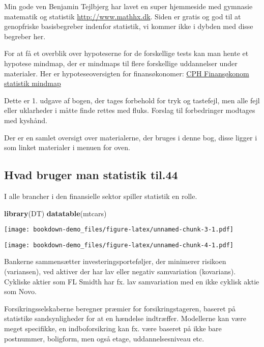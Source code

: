 \documentclass[]{book}
\newenvironment{Shaded}{\begin{snugshade}}{\end{snugshade}}
\newcommand{\KeywordTok}[1]{\textcolor[rgb]{0.13,0.29,0.53}{\textbf{#1}}}
\newcommand{\NormalTok}[1]{#1}
\theoremstyle{definition}
\theoremstyle{definition}
\theoremstyle{definition}
\theoremstyle{remark}
\begin{document}
Min gode ven Benjamin Tejlbjerg har lavet en super hjemmeside med
gymnasie matematik og statistik
\href{http://www.mathhx.dk/?q=node/117}{http://www.mathhx.dk}. Siden er
gratis og god til at genopfriske basisbegreber indenfor statistik, vi
kommer ikke i dybden med disse begreber her.

For at få et overblik over hypoteserne for de forskellige tests kan man
hente et hypotese mindmap, der er mindmaps til flere forskellige
uddannelser under materialer. Her er hypoteseoversigten for
finansøkonomer:
\href{https://drive.google.com/uc?export=download\&id=0B1E7VnhxsDMlQ1Zhdjh5WTJ4bnM}{CPH
Finansøkonom statistik mindmap}

Dette er 1. udgave af bogen, der tages forbehold for tryk og tastefejl,
men alle fejl eller uklarheder i måtte finde rettes med fluks. Forslag
til forbedringer modtages med kyshånd.

Der er en samlet oversigt over materialerne, der bruges i denne bog,
disse ligger i som linket materialer i menuen for oven.

\hypertarget{hvad-bruger-man-statistik-til.44}{%
\subsection{Hvad bruger man statistik
til.44}\label{hvad-bruger-man-statistik-til.44}}

I alle brancher i den finansielle sektor spiller statistik en rolle.

\begin{Shaded}
\begin{Highlighting}[]
\KeywordTok{library}\NormalTok{(DT)}
\KeywordTok{datatable}\NormalTok{(mtcars)}
\end{Highlighting}
\end{Shaded}

\texttt{[image: bookdown-demo\_files/figure-latex/unnamed-chunk-3-1.pdf]}

\texttt{[image: bookdown-demo\_files/figure-latex/unnamed-chunk-4-1.pdf]}

Bankerne sammensætter investeringsporteføljer, der minimerer risikoen
(variansen), ved aktiver der har lav eller negativ samvariation
(kovarians). Cykliske aktier som FL Smidth har fx. lav samvariation med
en ikke cyklisk aktie som Novo.

Forsikringsselskaberne beregner præmier for forsikringstageren, baseret
på statistike sandsynligheder for at en hændelse indtræffer. Modellerne
kan være meget specifikke, en indboforsikring kan fx. være baseret på
ikke bare postnummer, boligform, men også etage, uddannelsesniveau etc.
\end{document}
